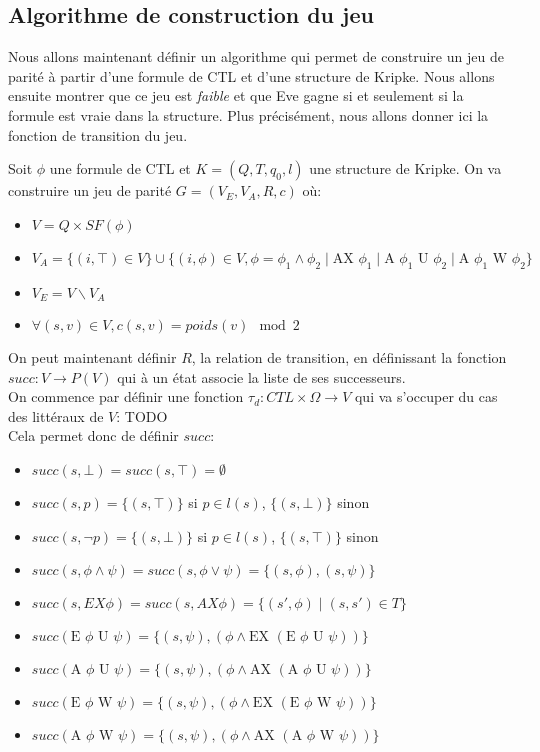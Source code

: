 \documentclass[10pt,a4paper]{article}
\begin{document}
\subsection{Algorithme de construction du jeu}
Nous allons maintenant définir un algorithme qui permet de construire un jeu de parité à partir d'une formule de CTL et d'une structure de Kripke. Nous allons ensuite montrer que ce jeu est \emph{faible} et que Eve gagne si et seulement si la formule est vraie dans la structure. Plus précisément, nous allons donner ici la fonction de transition du jeu.

Soit $\phi$ une formule de CTL et $K = (Q,T,q_0,l)$  une structure de Kripke.
On va construire un jeu de parité $G = (V_E,V_A,R,c)$ où:
\begin{itemize}
	\item $V = Q \times SF(\phi)$
	\item $V_A = \{(i, \top ) \in V\} \cup \{(i, \phi) \in V, \phi = \phi_1 \land \phi_2 \mid \mbox{AX } \phi_1\mid \mbox{A } \phi_1 \mbox{ U } \phi_2 \mid \mbox{A } \phi_1 \mbox{ W } \phi_2\}$
	\item $V_E = V \backslash V_A$
	\item $\forall (s,v) \in V, c(s,v) = poids(v) \mod 2$
\end{itemize}

On peut maintenant définir $R$, la relation de transition, en définissant la fonction $succ : V \to P(V)$ qui à un état associe la liste de ses successeurs.\\

On commence par définir une fonction $\tau_d : CTL \times \Omega \to V$ qui va s'occuper du cas des littéraux de $V$: TODO\\

Cela permet donc de définir $succ$:
\begin{itemize}
\item$ succ(s, \bot) = succ(s, \top) = \emptyset$
\item $succ(s, p) = \{(s,\top)\}$ si $p \in l(s)$, $\{(s,\bot)\}$ sinon
\item $succ(s, \neg p) = \{(s,\bot)\}$ si $p \in l(s)$, $\{(s,\top)\}$ sinon
\item $succ(s,\phi \land \psi) = succ(s, \phi \lor \psi) = \{(s,\phi), (s,\psi) \}$
\item $succ(s,EX \phi) = succ(s, AX \phi) = \{ (s', \phi) \mid (s,s') \in T \} $
\item $succ(\mbox{E } \phi \mbox{ U } \psi) = \{ (s,\psi), (\phi \land \mbox{EX }  (\mbox{E } \phi \mbox{ U } \psi)) \}$
\item $succ(\mbox{A } \phi \mbox{ U } \psi) = \{ (s,\psi), (\phi \land \mbox{AX }  (\mbox{A } \phi \mbox{ U } \psi)) \}$
\item $succ(\mbox{E } \phi \mbox{ W } \psi) = \{ (s,\psi), (\phi \land \mbox{EX }  (\mbox{E } \phi \mbox{ W } \psi)) \}$
\item $succ(\mbox{A } \phi \mbox{ W } \psi) = \{ (s,\psi), (\phi \land \mbox{AX } (\mbox{A } \phi \mbox{ W } \psi)) \}$
\end{itemize}
\end{document}
